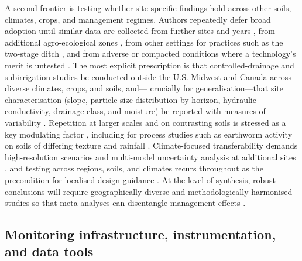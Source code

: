 \documentclass[11pt]{article}
\begin{document}
A second frontier is testing whether site-specific findings hold across
other soils, climates, crops, and management regimes. Authors repeatedly
defer broad adoption until similar data are collected from further sites and
years \parencite{Menegaz2025,Zimmerman2017b,Terrado2015}, from additional
agro-ecological zones \parencite{Ali2001}, from other settings for
practices such as the two-stage ditch \parencite{Hodaj2017}, and from
adverse or compacted conditions where a technology's merit is untested
\parencite{Bigelow2001}. The most explicit prescription is that
controlled-drainage and subirrigation studies be conducted outside the U.S.
Midwest and Canada across diverse climates, crops, and soils, and---
crucially for generalisation---that site characterisation (slope,
particle-size distribution by horizon, hydraulic conductivity, drainage
class, and moisture) be reported with measures of variability
\parencite{Singh2022b}. Repetition at larger scales and on contrasting soils
is stressed as a key modulating factor
\parencite{Bilotta2008,Goeken2015}, including for process studies such as
earthworm activity on soils of differing texture and rainfall
\parencite{Nuutinen2001,Nuutinen2011}. Climate-focused transferability
demands high-resolution scenarios and multi-model uncertainty analysis at
additional sites \parencite{Rasmussen2018,Jeantet2022,Jin2008}, and testing
across regions, soils, and climates recurs throughout as the precondition
for localised design guidance
\parencite{Singh2020b,Malota2024,Salazar2008,Holbak2021}. At the level of
synthesis, robust conclusions will require geographically diverse and
methodologically harmonised studies so that meta-analyses can disentangle
management effects \parencite{Wu2025}.

\subsection{Monitoring infrastructure, instrumentation, and data tools}
\end{document}
